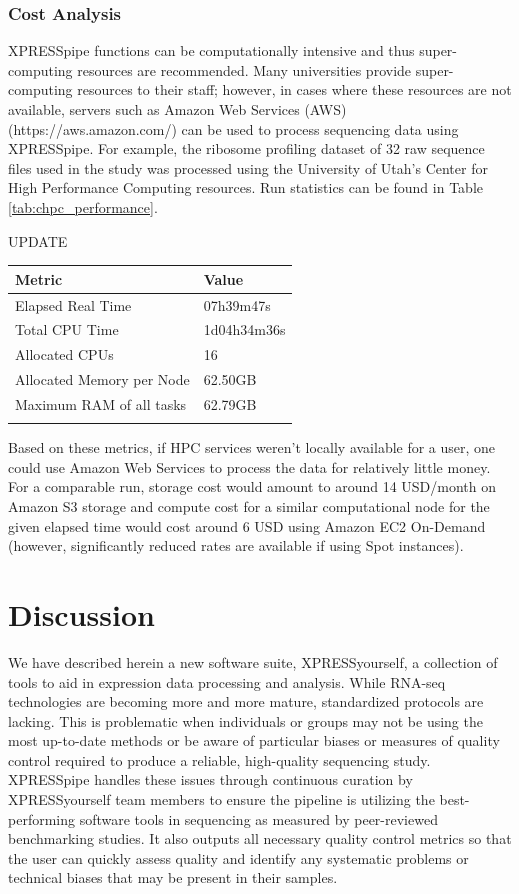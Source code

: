 \documentclass[11pt, a4paper, oneside]{article}
\begin{document}
\subsubsection{Cost Analysis}
XPRESSpipe functions can be computationally intensive and thus super-computing resources are recommended. Many universities provide super-computing resources to their staff; however, in cases where these resources are not available, servers such as Amazon Web Services (AWS) (https://aws.amazon.com/) can be used to process sequencing data using XPRESSpipe. For example, the ribosome profiling dataset of 32 raw sequence files used in the study was processed using the University of Utah's Center for High Performance Computing resources. Run statistics can be found in Table \ref{tab:chpc_performance}.

UPDATE
\begin{tabular}{p{5cm}p{3cm}}
\textbf{Metric} & \textbf{Value} \\
\hline
 Elapsed Real Time & 07h39m47s \\
 \hline
 Total CPU Time & 1d04h34m36s  \\
 \hline
 Allocated CPUs & 16 \\
 \hline
 Allocated Memory per Node & 62.50GB \\
 \hline
 Maximum RAM of all tasks & 62.79GB \\
 \label{tab:chpc_performance}
\end{tabular}
\newline

Based on these metrics, if HPC services weren't locally available for a user, one could use Amazon Web Services to process the data for relatively little money. For a comparable run, storage cost would amount to around 14 USD/month on Amazon S3 storage and compute cost for a similar computational node for the given elapsed time would cost around 6 USD using Amazon EC2 On-Demand (however, significantly reduced rates are available if using Spot instances).


\section{Discussion}
We have described herein a new software suite, XPRESSyourself, a collection of tools to aid in expression data processing and analysis. While RNA-seq technologies are becoming more and more mature, standardized protocols are lacking. This is problematic when individuals or groups may not be using the most up-to-date methods or be aware of particular biases or measures of quality control required to produce a reliable, high-quality sequencing study. XPRESSpipe handles these issues through continuous curation by XPRESSyourself team members to ensure the pipeline is utilizing the best-performing software tools in sequencing as measured by peer-reviewed benchmarking studies. It also outputs all necessary quality control metrics so that the user can quickly assess quality and identify any systematic problems or technical biases that may be present in their samples. \par
\end{document}
